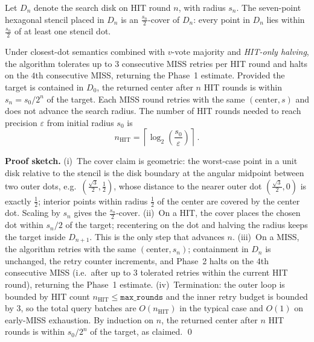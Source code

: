 \documentclass[sigconf,nonacm]{acmart}
\begin{document}
\begin{theorem}
\label{thm:rounds}
Let $D_n$ denote the search disk on HIT round $n$, with radius $s_n$.
The seven-point hexagonal stencil placed in $D_n$ is an
$\frac{s_n}{2}$-cover of $D_n$: every point in $D_n$ lies within
$\frac{s_n}{2}$ of at least one stencil dot.

Under closest-dot semantics combined with $v$-vote majority and
\emph{HIT-only halving}, the algorithm tolerates up to $3$ consecutive
MISS retries per HIT round and halts on the $4$th consecutive MISS,
returning the Phase~1 estimate.  Provided the target is contained in
$D_0$, the returned center after $n$ HIT rounds is within
$s_n = s_0/2^n$ of the target.  Each MISS round
retries with the same $(\text{center}, s)$ and does not advance the
search radius.  The number of HIT rounds needed to reach precision
$\varepsilon$ from initial radius $s_0$ is
\begin{equation}
  n_{\text{HIT}}
    = \left\lceil \log_2\!\left(\frac{s_0}{\varepsilon}\right) \right\rceil\,.
  \label{eq:rounds}
\end{equation}
\end{theorem}

\noindent
\textbf{Proof sketch.}
(i)~The cover claim is geometric: the worst-case point in a unit disk
relative to the stencil is the disk boundary at the angular midpoint
between two outer dots, e.g.\ $(\frac{\sqrt 3}{2}, \frac{1}{2})$, whose
distance to the nearer outer dot $(\frac{\sqrt 3}{2}, 0)$ is exactly
$\frac{1}{2}$; interior points within radius $\frac{1}{2}$ of the
center are covered by the center dot.  Scaling by $s_n$ gives the
$\frac{s_n}{2}$-cover.
(ii)~On a HIT, the cover places the chosen dot within $s_n/2$ of the
target; recentering on the dot and halving the radius keeps the
target inside $D_{n+1}$.  This is the only step that advances $n$.
(iii)~On a MISS, the algorithm retries with the same $(\text{center},
s_n)$; containment in $D_n$ is unchanged, the retry counter
increments, and Phase~2 halts on the $4$th consecutive MISS (i.e.\
after up to $3$ tolerated retries within the current HIT round),
returning the Phase~1 estimate.
(iv)~Termination: the outer loop is bounded by HIT count $n_{\text{HIT}}
\le \texttt{max\_rounds}$ and the inner retry budget is bounded by $3$,
so the total query batches are $O(n_{\text{HIT}})$ in the typical case
and $O(1)$ on early-MISS exhaustion.
By induction on $n$, the returned center after $n$ HIT rounds is within
$s_0/2^n$ of the target, as claimed.
\qed
\end{document}

